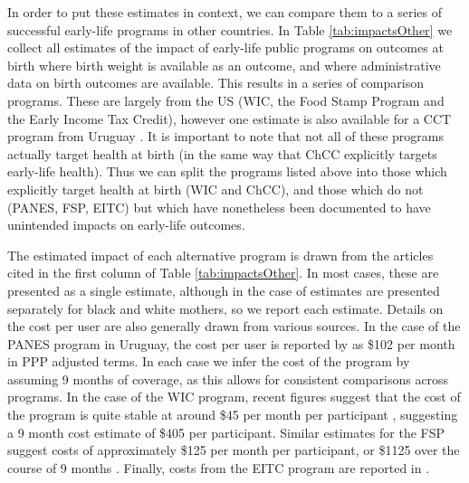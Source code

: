 \documentclass[12pt]{article}
\begin{document}
\begin{spacing}{1.4}
In order to put these estimates in context, we can compare them to a
series of successful early-life programs in other countries.  In Table
\ref{tab:impactsOther} we collect all estimates of the impact of
early-life public programs on outcomes at birth where birth weight is
available as an outcome, and where administrative data on birth outcomes
are available.  This results in a series of comparison programs.  These
are largely from the US (WIC, the Food Stamp Program and the Early
Income Tax Credit), however one estimate is also available for a CCT
program from Uruguay \citep{Amaranteetal2016}.  It is important to note
that not all of these programs actually target health at birth (in the same
way that ChCC explicitly targets early-life health).  Thus we can split
the programs listed above into those which explicitly target health at
birth (WIC and ChCC), and those which do not (PANES, FSP, EITC) but
which have nonetheless been documented to have unintended impacts on
early-life outcomes.


The estimated impact of each alternative program is drawn from the articles
cited in the first column of Table \ref{tab:impactsOther}.  In most cases,
these are presented as a single estimate, although in the case of
\citet{Almondetal2011} estimates are presented separately for black and
white mothers, so we report each estimate.  Details on the cost per user
are also generally drawn from various sources.  In the case of the PANES
program in Uruguay, the cost per user is reported by
\citet{Amaranteetal2016} as \$102 per month in PPP adjusted terms.  In each
case we infer the cost of the program by assuming 9 months of coverage, as
this allows for consistent comparisons across programs.  In the case of the
WIC program, recent figures suggest that the cost of the program is quite
stable at around \$45 per month per participant \citep{WIC2017}, suggesting
a 9 month cost estimate of \$405 per participant.  Similar estimates for
the FSP suggest costs of approximately \$125 per month per participant, or
\$1125 over the course of 9 months \citep{FSP2017}. Finally, costs from the
EITC program are reported in \citet[their Appendix Table A1]{Hoynesetal2015}.


\end{spacing}
\end{document}
